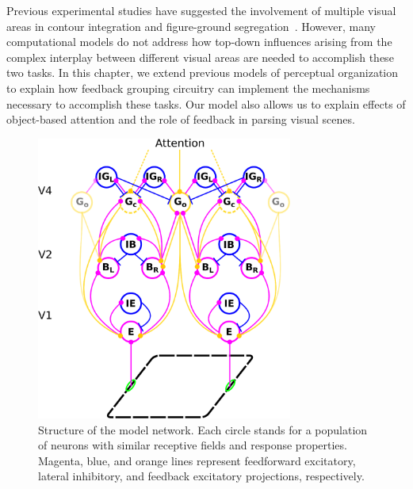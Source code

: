 Previous experimental studies have suggested the involvement of
multiple visual areas in contour integration and figure-ground
segregation~\citep{Poort_etal12,Chen_etal14}.  However, many
computational models do not address how top-down influences arising
from the complex interplay between different visual areas are needed
to accomplish these two tasks. In this chapter, we extend previous models of
perceptual organization~\citep{Craft_etal07,Mihalas_etal11b} to
explain how feedback grouping circuitry can implement the mechanisms
necessary to accomplish these tasks. Our model also allows us to
explain effects of object-based attention and the role of feedback in
parsing visual scenes.

\begin{figure}[t!]
\centering
\includegraphics[width=0.75\textwidth]{Contour/figs/Fig1.eps}
\makeatletter
\let\@currsize\normalsize
\caption[Structure of the grouping model network]{Structure of the model network. Each circle stands for a population of neurons with similar receptive fields and response properties. Magenta, blue, and orange lines represent feedforward excitatory, lateral inhibitory, and feedback excitatory projections, respectively.
}
\end{figure}
